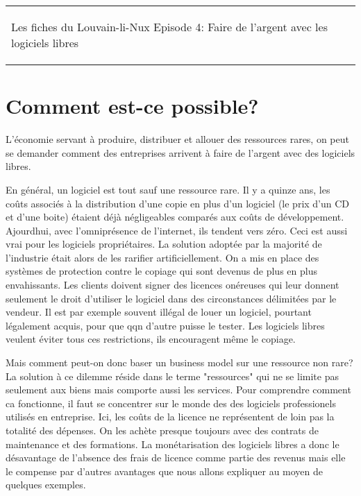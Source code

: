 



\begin{tabular}{p{13cm}r}
    \begin{center}{\Large Les fiches du Louvain-li-Nux\linebreak \linebreak
    \LARGE Episode 4: Faire de l'argent avec les logiciels libres}\end{center}
		&
	\usebox{\logollnux}
\end{tabular}


\section*{Comment est-ce possible?}
L'économie servant à produire, distribuer et allouer des ressources rares,
on peut se demander comment des entreprises arrivent à faire de l'argent avec des logiciels libres.

En général, un logiciel est tout sauf une ressource rare. Il y a quinze ans, les coûts
associés à la distribution d'une copie en plus d'un logiciel (le prix d'un CD et d'une boite) étaient déjà négligeables
comparés aux coûts de développement. Ajourdhui, avec l'omniprésence de l'internet, ils tendent vers zéro.
Ceci est aussi vrai pour les logiciels propriétaires. La solution adoptée par
la majorité de l'industrie était alors de les rarifier artificiellement.
On a mis en place des systèmes de protection contre le copiage qui sont devenus 
de plus en plus envahissants. Les clients doivent signer des licences onéreuses qui
leur donnent seulement le droit d'utiliser le logiciel dans des circonstances délimitées par le vendeur.
Il est par exemple souvent illégal de louer un logiciel, pourtant légalement acquis,
pour que qqn d'autre puisse le tester.
Les logiciels libres veulent éviter tous ces restrictions, ils encouragent même le copiage.

Mais comment peut-on donc baser un business model sur une ressource non rare?                           
La solution à ce dilemme réside dans le terme "ressources" qui
ne se limite pas seulement aux biens mais comporte aussi les services.
Pour comprendre comment ca fonctionne, il faut se concentrer sur le monde des 
des logiciels professionels utilisés en entreprise. Ici, les coûts de la licence
ne représentent de loin pas la totalité des dépenses. On les achète presque toujours avec
des contrats de maintenance et des formations.
La monétarisation des logiciels libres a donc le désavantage de l'absence des frais de licence
comme partie des revenus mais elle le compense par d'autres avantages que nous allons 
expliquer au moyen de quelques exemples.

